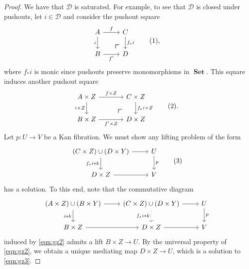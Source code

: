 \documentclass[10pt,letterpaper,cm]{nupset}
\theoremstyle{definition}
\theoremstyle{theorem}
\theoremstyle{remark}
\newcommand{\D}{\mathcal D}
\newcommand{\0}{\mathbf{0}}
\newcommand{\1}{\mathbf{1}}
\newcommand{\2}{\mathbf{2}}
\DeclareMathOperator{\set}{\mathbf{Set}}
\begin{document}
\begin{proof}
We have that $\D$ is saturated. For example, to see that $\D$ is closed under pushouts, let $i\in \D$ and consider the pushout square
\[ \label{eqn:gz1}
\begin{tikzcd}
A \arrow[d, "i"']
 \arrow[dr, phantom, "\scalebox{1.5}{\color{black}$\ulcorner$}", very near end, color=black] \arrow[r, "f"] & C \arrow[d, "f_{\ast}{i}"] \\
B \arrow[r, "f'"']               & D                  
\end{tikzcd} \tag{1}
,\] where  $f_{\ast}{i}$ is monic since pushouts preserve monomorphisms in $\set$.
This square induces another pushout square
\[ \label{eqn:gz2}
\begin{tikzcd}[column sep=large]
A\times Z \arrow[d, "i\times Z"'] 
 \arrow[dr, phantom, "\scalebox{1.5}{\color{black}$\ulcorner$}", very near end, color=black] 
 \arrow[r, "f\times Z"] & C\times Z \arrow[d, "f_{\ast}{i}\times Z"] \\
B\times Z \arrow[r, "f'\times Z"']                       & D\times Z                                 
\end{tikzcd} \tag{2}
.\] 
Let $p: U \to V$ be a Kan fibration. We must show any lifting problem of the form
\[ \label{eqn:gz3}
\begin{tikzcd}
\mleft(C \times Z\mright) \cup \mleft(D \times Y \mright) \arrow[d, "{f_{\ast}{i}}\mathbin{\ast}{k}"'] \arrow[r] & U \arrow[d, "p"] \\
D\times Z \arrow[r]                                                                         & V               
\end{tikzcd} \tag{3}
\] has a solution. To this end, note that the commutative diagram 
\[
\begin{tikzcd}
\mleft(A \times Z\mright) \cup \mleft(B \times Y \mright) \arrow[d, "i\mathbin{\ast}{k}"'] \arrow[r] & \mleft(C \times Z\mright) \cup \mleft(D \times Y \mright) \arrow[r] \arrow[d, "{f_{\ast}{i}}\mathbin{\ast}{k}"', dotted] & U \arrow[d, "p"] \\
B\times Z \arrow[r]                                                                                & D\times Z \arrow[r]                                                                                                    & V               
\end{tikzcd}
\] induced by \eqref{eqn:gz2} admits a lift $B\times Z \to U$. By the universal property of \eqref{eqn:gz2}, we obtain a unique mediating map $D\times Z \to U$, which is a  solution to \eqref{eqn:gz3}.

\medskip


\end{proof}
\end{document}
